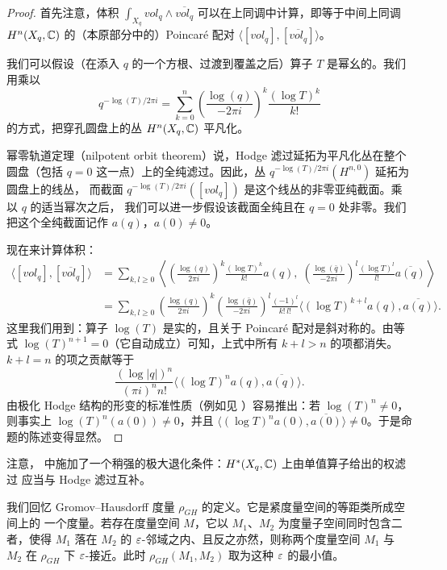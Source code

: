 \begin{proof}
首先注意，体积 $\int_{X_q}vol_q\wedge\overline{vol_q}$ 可以在上同调中计算，即等于中间上同调
$H^n(X_q,\mathbb{C})$ 的（本原部分中的）Poincaré 配对
$\langle[vol_q],[\overline{vol_q}]\rangle$。

我们可以假设（在添入 $q$ 的一个方根、过渡到覆盖之后）算子 $T$ 是幂幺的。我们用乘以
\[
  q^{-\log(T)/2\pi i}
  =\sum_{k=0}^{n}\left(\frac{\log(q)}{-2\pi i}\right)^{k}\frac{(\log T)^{k}}{k!}
\]
的方式，把穿孔圆盘上的丛 $H^n(X_q,\mathbb{C})$ 平凡化。

幂零轨道定理（nilpotent orbit theorem）说，Hodge 滤过延拓为平凡化丛在整个圆盘（包括
$q=0$ 这一点）上的全纯滤过。因此，丛 $q^{-\log(T)/2\pi i}(H^{n,0})$ 延拓为圆盘上的线丛，
而截面 $q^{-\log(T)/2\pi i}([vol_q])$ 是这个线丛的非零亚纯截面。乘以 $q$ 的适当幂次之后，
我们可以进一步假设该截面全纯且在 $q=0$ 处非零。我们把这个全纯截面记作 $a(q)$，$a(0)\ne0$。

现在来计算体积：
\begin{align*}
  \langle[vol_q],[\overline{vol_q}]\rangle
  &=\sum_{k,l\ge0}\left\langle
     \left(\frac{\log(q)}{2\pi i}\right)^{k}\frac{(\log T)^{k}}{k!}a(q),\;
     \left(\frac{\log(\bar q)}{-2\pi i}\right)^{l}\frac{(\log T)^{l}}{l!}\overline{a(q)}
   \right\rangle\\[2pt]
  &=\sum_{k,l\ge0}\left(\frac{\log(q)}{2\pi i}\right)^{k}
     \left(\frac{\log(\bar q)}{-2\pi i}\right)^{l}
     \frac{(-1)^{l}}{k!\,l!}
     \bigl\langle(\log T)^{k+l}a(q),\overline{a(q)}\bigr\rangle .
\end{align*}
这里我们用到：算子 $\log(T)$ 是实的，且关于 Poincaré 配对是斜对称的。由等式
$\log(T)^{n+1}=0$（它自动成立）可知，上式中所有 $k+l>n$ 的项都消失。$k+l=n$ 的项之贡献等于
\[
  \frac{(\log|q|)^{n}}{(\pi i)^{n}n!}
  \bigl\langle(\log T)^{n}a(q),\overline{a(q)}\bigr\rangle .
\]
由极化 Hodge 结构的形变的标准性质（例如见 \cite{De}）容易推出：若 $\log(T)^{n}\ne0$，
则事实上 $\log(T)^{n}(a(0))\ne0$，并且
$\bigl\langle(\log T)^{n}a(0),\overline{a(0)}\bigr\rangle\ne0$。于是命题的陈述变得显然。
\end{proof}

注意，\cite{De} 中施加了一个稍强的极大退化条件：$H^*(X_q,\mathbb{C})$ 上由单值算子给出的权滤过
应当与 Hodge 滤过互补。

我们回忆 Gromov--Hausdorff 度量 $\rho_{GH}$ 的定义。它是紧度量空间的等距类所成空间上的
一个度量。若存在度量空间 $M$，它以 $M_1$、$M_2$ 为度量子空间同时包含二者，使得 $M_1$
落在 $M_2$ 的 $\varepsilon$-邻域之内、且反之亦然，则称两个度量空间 $M_1$ 与 $M_2$ 在 $\rho_{GH}$
下 $\varepsilon$-接近。此时 $\rho_{GH}(M_1,M_2)$ 取为这种 $\varepsilon$ 的最小值。

